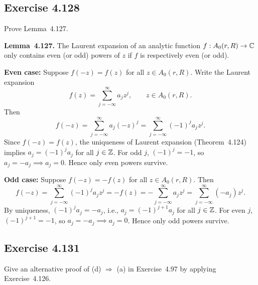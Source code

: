 \documentclass{article}
\begin{document}
\subsection{Exercise 4.128}
\label{sec:ca-ex-4-128}

Prove Lemma~4.127.

\begin{solution}
  \textbf{Lemma~4.127.} The Laurent expansion of an analytic function
  $f : A_0(r, R) \to \mathbb{C}$ only contains even (or odd) powers of $z$ if $f$ is
  respectively even (or odd).

  \medskip
  \noindent\textbf{Even case:} Suppose $f(-z) = f(z)$ for all
  $z \in A_0(r, R)$. Write the Laurent expansion
  \[
    f(z) = \sum_{j=-\infty}^{\infty} a_j z^j, \qquad z \in A_0(r, R).
  \]
  Then
  \[
    f(-z) = \sum_{j=-\infty}^{\infty} a_j (-z)^j
    = \sum_{j=-\infty}^{\infty} (-1)^j a_j z^j.
  \]
  Since $f(-z) = f(z)$, the uniqueness of Laurent expansion
  (Theorem~4.124) implies $a_j = (-1)^j a_j$ for all $j \in \mathbb{Z}$.
  For odd $j$, $(-1)^j = -1$, so $a_j = -a_j \implies a_j = 0$.
  Hence only even powers survive.

  \medskip
  \noindent\textbf{Odd case:} Suppose $f(-z) = -f(z)$ for all
  $z \in A_0(r, R)$. Then
  \[
    f(-z) = \sum_{j=-\infty}^{\infty} (-1)^j a_j z^j
    = -f(z) = -\sum_{j=-\infty}^{\infty} a_j z^j
    = \sum_{j=-\infty}^{\infty} (-a_j) z^j.
  \]
  By uniqueness, $(-1)^j a_j = -a_j$, i.e., $a_j = (-1)^{j+1} a_j$ for all
  $j \in \mathbb{Z}$. For even $j$, $(-1)^{j+1} = -1$, so $a_j = -a_j \implies a_j = 0$.
  Hence only odd powers survive.
\end{solution}

\subsection{Exercise 4.131}

Give an alternative proof of (d) $\Rightarrow$ (a) in Exercise~4.97 by
applying Exercise~4.126.
\end{document}

